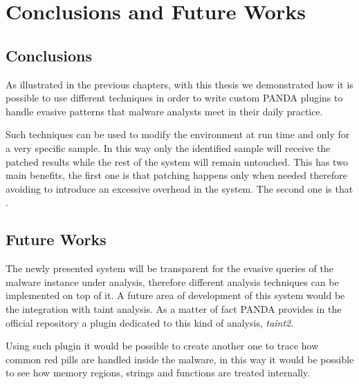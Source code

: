 \chapter{Conclusions and Future Works}
\label{chap:6}

\section{Conclusions}

As illustrated in the previous chapters, with this thesis we demonstrated how it is possible to use different techniques in order to write custom PANDA plugins to handle evasive patterns that malware analysts meet in their daily practice.   

Such techniques can be used to modify the environment at run time and only for a very specific sample. In this way only the identified sample will receive the patched results while the rest of the system will remain untouched. This has two main benefits, the first one is that patching happens only when needed therefore avoiding to introduce an excessive overhead in the system. The second one is that  .


\section{Future Works}

The newly presented system will be transparent for the evasive queries of the malware instance under analysis, therefore different analysis techniques can be implemented on top of it. A future area of development of this system would be the integration with taint analysis. As a matter of fact PANDA provides in the official repository a plugin dedicated to this kind of analysis, \textit{taint2}. 

Using such plugin it would be possible to create another one to trace how common red pills are handled inside the malware, in this way it would be possible to see how memory regions, strings and functions are treated internally.

